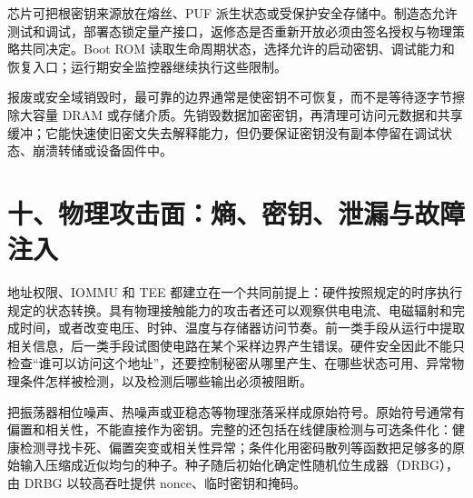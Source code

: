 
芯片可把根密钥来源放在熔丝、PUF 派生状态或受保护安全存储中。制造态允许测试和调试，部署态锁定量产接口，返修态是否重新开放必须由签名授权与物理策略共同决定。Boot ROM 读取生命周期状态，选择允许的启动密钥、调试能力和恢复入口；运行期安全监控器继续执行这些限制。

报废或安全域销毁时，最可靠的边界通常是使密钥不可恢复，而不是等待逐字节擦除大容量 DRAM 或存储介质。先销毁数据加密密钥，再清理可访问元数据和共享缓冲；它能快速使旧密文失去解释能力，但仍要保证密钥没有副本停留在调试状态、崩溃转储或设备固件中。
\section{十、物理攻击面：熵、密钥、泄漏与故障注入}

地址权限、IOMMU 和 TEE 都建立在一个共同前提上：硬件按照规定的时序执行规定的状态转换。具有物理接触能力的攻击者还可以观察供电电流、电磁辐射和完成时间，或者改变电压、时钟、温度与存储器访问节奏。前一类手段从运行中提取相关信息，后一类手段试图使电路在某个采样边界产生错误。硬件安全因此不能只检查“谁可以访问这个地址”，还要控制秘密从哪里产生、在哪些状态可用、异常物理条件怎样被检测，以及检测后哪些输出必须被阻断。\cite{nist-ir8320}


把振荡器相位噪声、热噪声或亚稳态等物理涨落采样成原始符号。原始符号通常有偏置和相关性，不能直接作为密钥。完整的还包括在线健康检测与可选条件化：健康检测寻找卡死、偏置突变或相关性异常；条件化用密码散列等函数把足够多的原始输入压缩成近似均匀的种子。种子随后初始化确定性随机位生成器（DRBG），由 DRBG 以较高吞吐提供 nonce、临时密钥和掩码。\cite{nist-sp800-90b}

